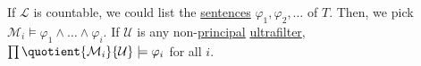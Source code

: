 \begin{intuition}
\end{intuition}

If \(\mathcal{L} \) is countable, we could list the \hyperref[def:sentence]{sentences} \(\varphi _1, \varphi _2, \dots \) of \(T\). Then, we pick \(\mathcal{M} _i \models \varphi _1 \land \dots \land \varphi _i\). If \(\mathcal{U} \) is any non-\hyperref[eg:principal-filter]{principal} \hyperref[def:ultrafilter]{ultrafilter}, \(\prod \quotient{\mathcal{M} _i}{\mathcal{U} } \models \varphi _i\) for all \(i\).
